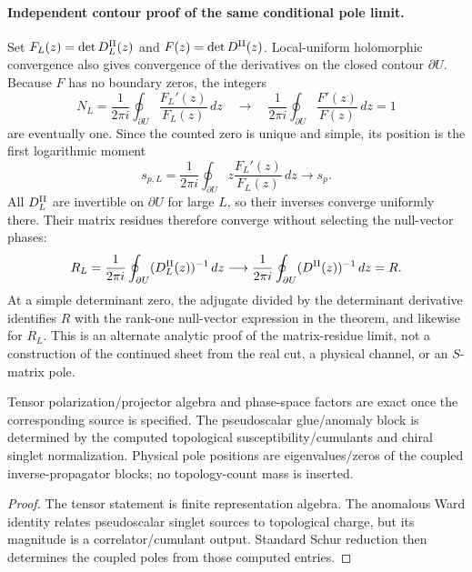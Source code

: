 \documentclass[12pt,a4paper]{article}
\begin{document}
\paragraph{Independent contour proof of the same conditional pole limit.}
Set $F_L(z)=\det D_L^{\rm II}(z)$ and
$F(z)=\det D^{\rm II}(z)$.  Local-uniform holomorphic convergence
also gives convergence of the derivatives on the closed contour
$\partial U$.  Because $F$ has no boundary zeros, the integers
\[
 N_L=\frac{1}{2\pi i}\oint_{\partial U}\frac{F_L'(z)}{F_L(z)}\,dz
 \quad\longrightarrow\quad
 \frac{1}{2\pi i}\oint_{\partial U}\frac{F'(z)}{F(z)}\,dz=1
\]
are eventually one.  Since the counted zero is unique and simple,
its position is the first logarithmic moment
\[
 s_{p,L}=\frac{1}{2\pi i}\oint_{\partial U}
 z\frac{F_L'(z)}{F_L(z)}\,dz\longrightarrow s_p.
\]
All $D_L^{\rm II}$ are invertible on $\partial U$ for large $L$,
so their inverses converge uniformly there.  Their matrix residues
therefore converge without selecting the null-vector phases:
\[
 R_L=\frac{1}{2\pi i}\oint_{\partial U}(D_L^{\rm II}(z))^{-1}\,dz
 \longrightarrow
 \frac{1}{2\pi i}\oint_{\partial U}(D^{\rm II}(z))^{-1}\,dz=R.
\]
At a simple determinant zero, the adjugate divided by the determinant
derivative identifies $R$ with the rank-one null-vector expression in
the theorem, and likewise for $R_L$.  This is an alternate analytic
proof of the matrix-residue limit, not a construction of the continued
sheet from the real cut, a physical channel, or an $S$-matrix pole.

\begin{theorem}
\label{p11:thm:tensor-pseudoscalar-glue-closures}

Tensor polarization/projector algebra and phase-space factors are exact once the corresponding source is specified.  The pseudoscalar glue/anomaly block is determined by the computed topological susceptibility/cumulants and chiral singlet normalization.  Physical pole positions are eigenvalues/zeros of the coupled inverse-propagator blocks; no topology-count mass is inserted.
\label{p11:eq:tensor-pp-schur-cut}
\label{p11:eq:pseudoscalar-glue-rank-one-block}
\end{theorem}
\begin{proof}

The tensor statement is finite representation algebra.  The anomalous Ward identity relates pseudoscalar singlet sources to topological charge, but its magnitude is a correlator/cumulant output.  Standard Schur reduction then determines the coupled poles from those computed entries.
\end{proof}
\end{document}
